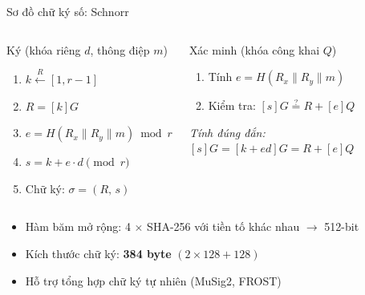 \begin{frame}{Sơ đồ chữ ký số: Schnorr}
  \begin{columns}[t]
      \begin{block}{Ký (khóa riêng $d$, thông điệp $m$)}
        \begin{enumerate}
          \item $k \xleftarrow{R} [1, r{-}1]$
          \item $R = [k]G$
          \item $e = H(R_x \| R_y \| m) \bmod r$
          \item $s = k + e \cdot d \pmod{r}$
          \item Chữ ký: $\sigma = (R,\, s)$
        \end{enumerate}
      \end{block}
      \begin{block}{Xác minh (khóa công khai $Q$)}
        \begin{enumerate}
          \item Tính $e = H(R_x \| R_y \| m)$
          \item Kiểm tra: $[s]G \stackrel{?}{=} R + [e]Q$
        \end{enumerate}
        \vspace{0.3em}
        \textit{Tính đúng đắn:}
        $[s]G = [k{+}ed]G = R + [e]Q$ \checkmark
      \end{block}
  \end{columns}
  \vspace{0.3em}
  \begin{itemize}
    \item Hàm băm mở rộng: 4 $\times$ SHA-256 với tiền tố khác nhau $\rightarrow$ 512-bit
    \item Kích thước chữ ký: \textbf{384 byte} $(2\times 128 + 128)$
    \item Hỗ trợ tổng hợp chữ ký tự nhiên (MuSig2, FROST)
  \end{itemize}
\end{frame}
